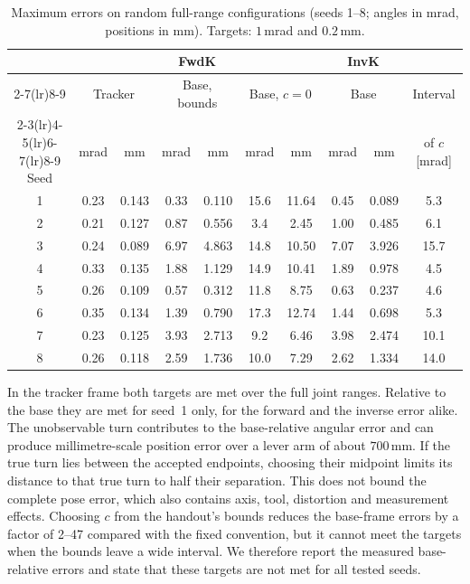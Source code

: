 \documentclass[../main.tex]{subfiles}
\begin{document}
\begin{table}[H]
\centering\small
\caption{Maximum errors on random full-range configurations (seeds 1--8; angles in mrad, positions in mm). Targets: $1$\,mrad and $0.2$\,mm.}\label{tab:res-base}
\setlength{\tabcolsep}{5pt}
\begin{tabular}{@{}c*{8}{c}c@{}}
\toprule
 & \multicolumn{6}{c}{FwdK} & \multicolumn{2}{c}{InvK} & \\
\cmidrule(lr){2-7}\cmidrule(lr){8-9}
 & \multicolumn{2}{c}{Tracker} & \multicolumn{2}{c}{Base, bounds} & \multicolumn{2}{c}{Base, $c=0$} & \multicolumn{2}{c}{Base} & Interval \\
\cmidrule(lr){2-3}\cmidrule(lr){4-5}\cmidrule(lr){6-7}\cmidrule(lr){8-9}
Seed & mrad & mm & mrad & mm & mrad & mm & mrad & mm & of $c$ [mrad] \\\midrule
1 & 0.23 & 0.143 & 0.33 & 0.110 & 15.6 & 11.64 & 0.45 & 0.089 & 5.3 \\
2 & 0.21 & 0.127 & 0.87 & 0.556 & 3.4 & 2.45 & 1.00 & 0.485 & 6.1 \\
3 & 0.24 & 0.089 & 6.97 & 4.863 & 14.8 & 10.50 & 7.07 & 3.926 & 15.7 \\
4 & 0.33 & 0.135 & 1.88 & 1.129 & 14.9 & 10.41 & 1.89 & 0.978 & 4.5 \\
5 & 0.26 & 0.109 & 0.57 & 0.312 & 11.8 & 8.75 & 0.63 & 0.237 & 4.6 \\
6 & 0.35 & 0.134 & 1.39 & 0.790 & 17.3 & 12.74 & 1.44 & 0.698 & 5.3 \\
7 & 0.23 & 0.125 & 3.93 & 2.713 & 9.2 & 6.46 & 3.98 & 2.474 & 10.1 \\
8 & 0.26 & 0.118 & 2.59 & 1.736 & 10.0 & 7.29 & 2.62 & 1.334 & 14.0 \\
\bottomrule
\end{tabular}
\end{table}
In the tracker frame both targets are met over the full joint ranges. Relative to the base they are met for seed~1 only, for the forward and the inverse error alike. The unobservable turn contributes to the base-relative angular error and can produce millimetre-scale position error over a lever arm of about $700$\,mm. If the true turn lies between the accepted endpoints, choosing their midpoint limits its distance to that true turn to half their separation. This does not bound the complete pose error, which also contains axis, tool, distortion and measurement effects. Choosing $c$ from the handout's bounds reduces the base-frame errors by a factor of 2--47 compared with the fixed convention, but it cannot meet the targets when the bounds leave a wide interval. We therefore report the measured base-relative errors and state that these targets are not met for all tested seeds.
\end{document}
